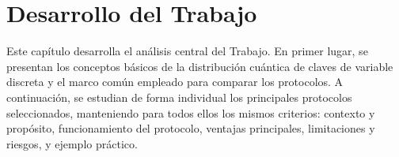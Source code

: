 \chapter{Desarrollo del Trabajo}

Este capítulo desarrolla el análisis central del Trabajo. En primer lugar, se presentan los conceptos básicos de la distribución cuántica de claves de variable discreta y el marco común empleado para comparar los protocolos. A continuación, se estudian de forma individual los principales protocolos seleccionados, manteniendo para todos ellos los mismos criterios: contexto y propósito, funcionamiento del protocolo, ventajas principales, limitaciones y riesgos, y ejemplo práctico.










